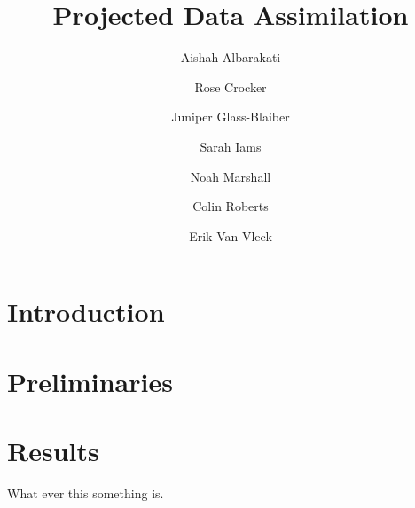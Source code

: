 \documentclass[12pt]{article}
\title{Projected Data Assimilation}
\author{Aishah Albarakati}
\author{Rose Crocker}
\author{Juniper Glass-Blaiber}
\author{Sarah Iams}
\author{Noah Marshall}
\author{Colin Roberts}
\author{Erik Van Vleck}
\begin{document}
\section{Introduction}


\section{Preliminaries}


\section{Results}


\newpage
\begin{thebibliography}{1}
	
	 What ever this something is.
	
\end{thebibliography}
\end{document}
